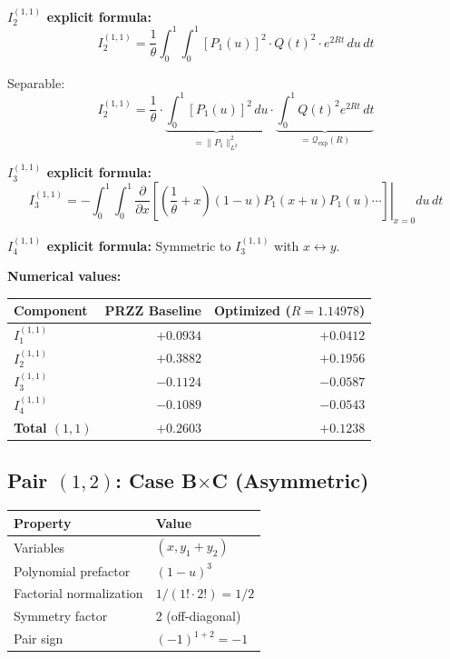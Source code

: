 \documentclass[11pt]{article}
\begin{document}
\textbf{$I_2^{(1,1)}$ explicit formula:}
\begin{equation}
I_2^{(1,1)} = \frac{1}{\theta} \int_0^1 \int_0^1 [P_1(u)]^2 \cdot Q(t)^2 \cdot e^{2Rt} \, du\, dt
\end{equation}

Separable:
\begin{equation}
I_2^{(1,1)} = \frac{1}{\theta} \cdot \underbrace{\int_0^1 [P_1(u)]^2 \, du}_{= \|P_1\|_{L^2}^2} \cdot \underbrace{\int_0^1 Q(t)^2 e^{2Rt} \, dt}_{= \mathcal{Q}_{\exp}(R)}
\end{equation}

\textbf{$I_3^{(1,1)}$ explicit formula:}
\begin{equation}
I_3^{(1,1)} = -\int_0^1 \int_0^1 \left.\frac{\partial}{\partial x}\left[\left(\frac{1}{\theta} + x\right) (1-u) P_1(x+u) P_1(u) \cdots\right]\right|_{x=0} du\, dt
\end{equation}

\textbf{$I_4^{(1,1)}$ explicit formula:}
Symmetric to $I_3^{(1,1)}$ with $x \leftrightarrow y$.

\textbf{Numerical values:}

\begin{center}
\begin{tabular}{lrr}
\toprule
Component & PRZZ Baseline & Optimized ($R=1.14978$) \\
\midrule
$I_1^{(1,1)}$ & $+0.0934$ & $+0.0412$ \\
$I_2^{(1,1)}$ & $+0.3882$ & $+0.1956$ \\
$I_3^{(1,1)}$ & $-0.1124$ & $-0.0587$ \\
$I_4^{(1,1)}$ & $-0.1089$ & $-0.0543$ \\
\midrule
\textbf{Total $(1,1)$} & $+0.2603$ & $+0.1238$ \\
\bottomrule
\end{tabular}
\end{center}

\subsection{Pair $(1,2)$: Case B$\times$C (Asymmetric)}

\begin{center}
\begin{tabular}{ll}
\toprule
Property & Value \\
\midrule
Variables & $(x, y_1+y_2)$ \\
Polynomial prefactor & $(1-u)^3$ \\
Factorial normalization & $1/(1! \cdot 2!) = 1/2$ \\
Symmetry factor & 2 (off-diagonal) \\
Pair sign & $(-1)^{1+2} = -1$ \\
\bottomrule
\end{tabular}
\end{center}
\end{document}
